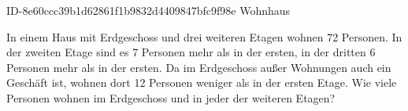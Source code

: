\begin{exercise}
      {ID-8e60ccc39b1d62861f1b9832d4409847bfc9f98e}
      {Wohnhaus}
  \ifproblem\problem\par
    In einem Haus mit Erdgeschoss und drei weiteren Etagen wohnen 72 Personen.
    In der zweiten Etage sind es 7 Personen mehr als in der ersten, in der
    dritten 6 Personen mehr als in der ersten. Da im Erdgeschoss außer
    Wohnungen auch ein Geschäft ist, wohnen dort 12 Personen weniger als in
    der ersten Etage. Wie viele Personen wohnen im Erdgeschoss und in jeder
    der weiteren Etagen?
  \fi
\end{exercise}
